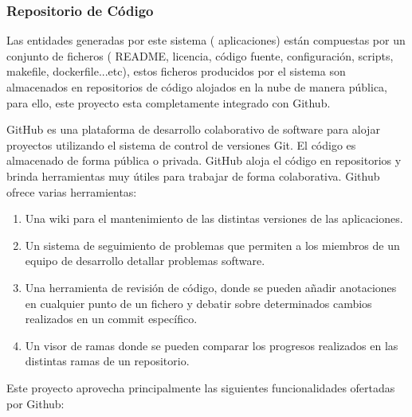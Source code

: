 \documentclass[a4paper,11pt]{book}
\begin{document}
\subsubsection{Repositorio de Código}

Las entidades generadas por este sistema ( aplicaciones) están compuestas por un conjunto de ficheros ( README, licencia, código fuente, configuración, scripts, makefile, dockerfile...etc), estos ficheros producidos por el sistema son almacenados en repositorios de código alojados en la nube de manera pública, para ello, este proyecto esta completamente integrado con Github\cite{github}. 

GitHub\cite{github} es una plataforma de desarrollo colaborativo de software para alojar proyectos utilizando el sistema de control de versiones Git. El código es almacenado de forma pública o privada. GitHub aloja el código en repositorios y brinda herramientas muy útiles para trabajar de forma colaborativa. Github\cite{github2} ofrece varias herramientas:

\begin{enumerate}
\item Una wiki para el mantenimiento de las distintas versiones de las aplicaciones. 
\item Un sistema de seguimiento de problemas que permiten a los miembros de un equipo de desarrollo detallar problemas software.
\item Una herramienta de revisión de código, donde se pueden añadir anotaciones en cualquier punto de un fichero y debatir sobre determinados cambios realizados en un commit específico. 
\item Un visor de ramas donde se pueden comparar los progresos realizados en las distintas ramas de un repositorio. 
\end{enumerate}   


Este proyecto aprovecha principalmente las siguientes funcionalidades ofertadas por Github:
\end{document}
